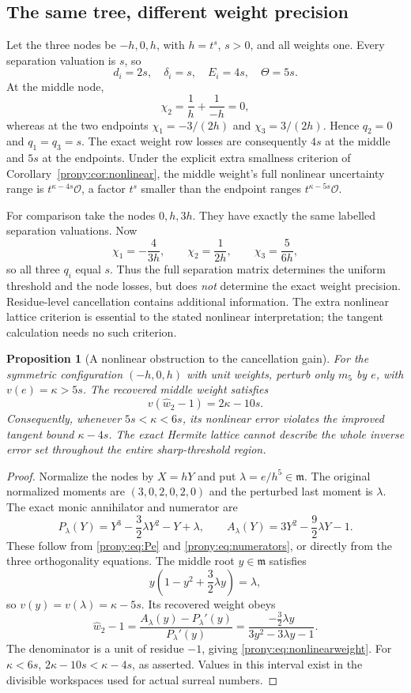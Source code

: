 \documentclass[11pt,letterpaper]{article}
\newtheorem{proposition}[theorem]{Proposition}
\theoremstyle{definition}
\theoremstyle{remark}
\newcommand{\Ocal}{\mathcal O}
\newcommand{\mfr}{\mathfrak m}
\newcommand{\wh}{\widehat w}
\begin{document}
\subsection{The same tree, different weight precision}
Let the three nodes be $-h,0,h$, with $h=t^s$, $s>0$, and all weights one.
Every separation valuation is $s$, so
\[
 d_i=2s,\quad \delta_i=s,\quad E_i=4s,\quad\Theta=5s.
\]
At the middle node,
\[
 \chi_2=\frac1h+\frac1{-h}=0,
\]
whereas at the two endpoints $\chi_1=-3/(2h)$ and $\chi_3=3/(2h)$.
Hence $q_2=0$ and $q_1=q_3=s$.
The exact weight row losses are consequently $4s$ at the middle and $5s$
at the endpoints. Under the explicit extra smallness criterion of
Corollary~\ref{prony:cor:nonlinear}, the middle weight's full nonlinear uncertainty
range is $t^{\kappa-4s}\Ocal$, a factor $t^s$ smaller than the endpoint
ranges $t^{\kappa-5s}\Ocal$.

For comparison take the nodes $0,h,3h$. They have exactly the same labelled
separation valuations. Now
\[
 \chi_1=-\frac4{3h},\qquad \chi_2=\frac1{2h},\qquad \chi_3=\frac5{6h},
\]
so all three $q_i$ equal $s$. Thus the full separation matrix determines
the uniform threshold and the node losses, but does \emph{not} determine
the exact weight precision. Residue-level cancellation contains additional
information. The extra nonlinear lattice criterion is essential to the
stated nonlinear interpretation; the tangent calculation needs no such
criterion.


\begin{proposition}[A nonlinear obstruction to the cancellation gain]
\label{prony:prop:nonlinearobstruction}
For the symmetric configuration $(-h,0,h)$ with unit weights, perturb only
$m_5$ by $e$, with $v(e)=\kappa>5s$. The recovered middle weight satisfies
\begin{equation}\label{prony:eq:nonlinearweight}
 v(\wh_2-1)=2\kappa-10s.
\end{equation}
Consequently, whenever $5s<\kappa<6s$, its nonlinear error violates the
improved tangent bound $\kappa-4s$. The exact Hermite lattice cannot describe
the whole inverse error set throughout the entire sharp-threshold region.
\end{proposition}
\begin{proof}
Normalize the nodes by $X=hY$ and put $\lambda=e/h^5\in\mfr$.
The original normalized moments are $(3,0,2,0,2,0)$ and the perturbed last
moment is $\lambda$. The exact monic annihilator and numerator are
\[
 P_\lambda(Y)=Y^3-\frac32\lambda Y^2-Y+\lambda,
 \qquad
 A_\lambda(Y)=3Y^2-\frac92\lambda Y-1.
\]
These follow from \eqref{prony:eq:Pe} and \eqref{prony:eq:numerators}, or directly
from the three orthogonality equations. The middle root $y\in\mfr$
satisfies
\[
 y\left(1-y^2+\frac32\lambda y\right)=\lambda,
\]
so $v(y)=v(\lambda)=\kappa-5s$. Its recovered weight obeys
\[
 \wh_2-1
 =\frac{A_\lambda(y)-P_\lambda'(y)}{P_\lambda'(y)}
 =\frac{-\tfrac32\lambda y}{3y^2-3\lambda y-1}.
\]
The denominator is a unit of residue $-1$, giving
\eqref{prony:eq:nonlinearweight}. For $\kappa<6s$,
$2\kappa-10s<\kappa-4s$, as asserted. Values in this interval exist in
the divisible workspaces used for actual surreal numbers.
\end{proof}
\end{document}

